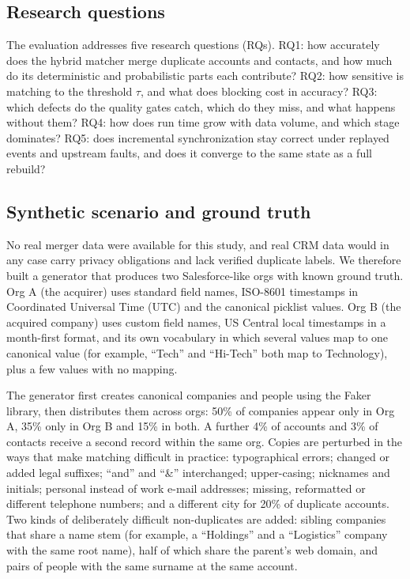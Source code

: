 \subsection{Research questions}\label{sec:4.1}

The evaluation addresses five research questions (RQs). RQ1: how accurately does the hybrid matcher merge duplicate accounts and contacts, and how much do its deterministic and probabilistic parts each contribute? RQ2: how sensitive is matching to the threshold $\tau$, and what does blocking cost in accuracy? RQ3: which defects do the quality gates catch, which do they miss, and what happens without them? RQ4: how does run time grow with data volume, and which stage dominates? RQ5: does incremental synchronization stay correct under replayed events and upstream faults, and does it converge to the same state as a full rebuild?

\subsection{Synthetic scenario and ground truth}\label{sec:4.2}

No real merger data were available for this study, and real CRM data would in any case carry privacy obligations and lack verified duplicate labels. We therefore built a generator that produces two Salesforce-like orgs with known ground truth. Org A (the acquirer) uses standard field names, ISO-8601 timestamps in Coordinated Universal Time (UTC) and the canonical picklist values. Org B (the acquired company) uses custom field names, US Central local timestamps in a month-first format, and its own vocabulary in which several values map to one canonical value (for example, ``Tech'' and ``Hi-Tech'' both map to Technology), plus a few values with no mapping.

The generator first creates canonical companies and people using the Faker library, then distributes them across orgs: 50\% of companies appear only in Org A, 35\% only in Org B and 15\% in both. A further 4\% of accounts and 3\% of contacts receive a second record within the same org. Copies are perturbed in the ways that make matching difficult in practice: typographical errors; changed or added legal suffixes; ``and'' and ``\&'' interchanged; upper-casing; nicknames and initials; personal instead of work e-mail addresses; missing, reformatted or different telephone numbers; and a different city for 20\% of duplicate accounts. Two kinds of deliberately difficult non-duplicates are added: sibling companies that share a name stem (for example, a ``Holdings'' and a ``Logistics'' company with the same root name), half of which share the parent's web domain, and pairs of people with the same surname at the same account.

